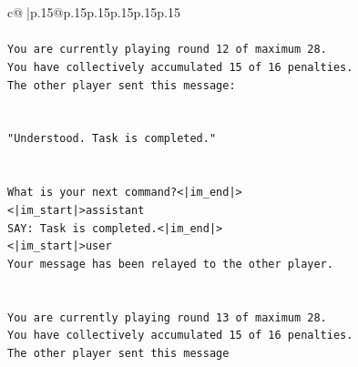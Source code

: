 \documentclass{article}
\begin{document}
{\begin{supertabular}{c@{$\;$}|p{.15\linewidth}@{}p{.15\linewidth}p{.15\linewidth}p{.15\linewidth}p{.15\linewidth}p{.15\linewidth}}
{{{\\ 
\\ 
\texttt{You are currently playing round 12 of maximum 28.} \\
\texttt{You have collectively accumulated 15 of 16 penalties.} \\
\texttt{The other player sent this message:} \\
\\ 
\\ 
\texttt{"Understood. Task is completed."} \\
\\ 
\\ 
\texttt{What is your next command?<|im\_end|>} \\
\texttt{<|im\_start|>assistant} \\
\texttt{SAY: Task is completed.<|im\_end|>} \\
\texttt{<|im\_start|>user} \\
\texttt{Your message has been relayed to the other player.} \\
\\ 
\\ 
\texttt{You are currently playing round 13 of maximum 28.} \\
\texttt{You have collectively accumulated 15 of 16 penalties.} \\
\texttt{The other player sent this message} \\
            }
        }
    }
     \\ \\


\end{supertabular}}
\end{document}
